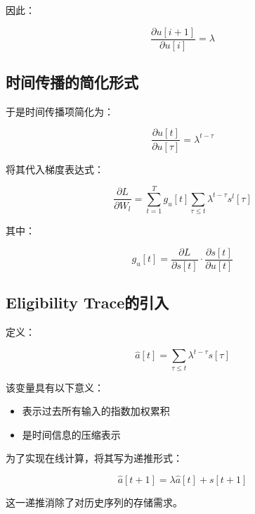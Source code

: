 \documentclass[journal,12pt,onecolumn]{IEEEtran}
\begin{document}
因此：

\begin{equation}
\frac{\partial u[i+1]}{\partial u[i]} = \lambda
\end{equation}



\subsection{时间传播的简化形式}

于是时间传播项简化为：

\begin{equation}
\frac{\partial u[t]}{\partial u[\tau]} = \lambda^{t-\tau}
\end{equation}

将其代入梯度表达式：

\begin{equation}
\frac{\partial L}{\partial W_l}
=
\sum_{t=1}^{T}
g_u[t]
\sum_{\tau \le t}
\lambda^{t-\tau} s^l[\tau]
\end{equation}

其中：

\begin{equation}
g_u[t] = \frac{\partial L}{\partial s[t]} \cdot \frac{\partial s[t]}{\partial u[t]}
\end{equation}



\subsection{Eligibility Trace的引入}

定义：

\begin{equation}
\hat{a}[t] = \sum_{\tau \le t} \lambda^{t-\tau} s[\tau]
\end{equation}

该变量具有以下意义：

\begin{itemize}
\item 表示过去所有输入的指数加权累积
\item 是时间信息的压缩表示
\end{itemize}

为了实现在线计算，将其写为递推形式：

\begin{equation}
\hat{a}[t+1] = \lambda \hat{a}[t] + s[t+1]
\end{equation}

这一递推消除了对历史序列的存储需求。
\end{document}
